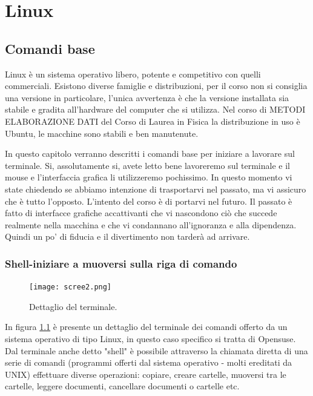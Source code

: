 \documentclass[11pt,fleqn]{book} %
\begin{document}
\pagestyle{fancy} %


\part{Linux}

\chapter{Comandi base}

Linux è un sistema operativo libero, potente e competitivo con quelli commerciali. Esistono diverse famiglie e distribuzioni, per il corso non si consiglia una versione in particolare, l'unica avvertenza è che la versione installata sia stabile e gradita all'hardware del computer che si utilizza. Nel corso di METODI ELABORAZIONE DATI del Corso di Laurea in Fisica la distribuzione in uso è Ubuntu, le macchine sono stabili e ben manutenute.

In questo capitolo verranno descritti i comandi base per iniziare a lavorare sul terminale. Si, assolutamente si, avete letto bene lavoreremo sul terminale e il mouse e l'interfaccia grafica li utilizzeremo pochissimo. In questo momento vi state chiedendo se abbiamo intenzione di trasportarvi nel passato, ma vi assicuro che è tutto l'opposto. L'intento del corso è di portarvi nel futuro. Il passato è fatto di interfacce grafiche accattivanti che vi nascondono ciò che succede realmente nella macchina e che vi condannano all'ignoranza e alla dipendenza. Quindi un po' di fiducia e il divertimento non tarderà ad arrivare.

\section{Shell-iniziare a muoversi sulla riga di comando}

\begin{figure}
\centering
\texttt{[image: scree2.png]}
\caption{Dettaglio del terminale. \label{screen2}}
\end{figure}


In figura  \ref{screen2} è presente  un dettaglio del terminale dei comandi offerto da un sistema operativo di tipo Linux, in questo caso specifico si tratta di Opensuse. 
Dal terminale anche detto "shell" è possibile attraverso la chiamata diretta di una serie di comandi (programmi offerti dal sistema operativo - molti ereditati da UNIX) effettuare diverse operazioni: copiare, creare cartelle, muoversi tra le cartelle, leggere documenti, cancellare documenti o cartelle etc.
\end{document}
